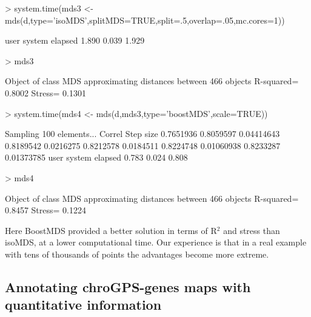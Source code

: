 \documentclass[a4paper,12pt,nogin]{article}
\newcommand{\newtext}[1]{{\color{blue} #1}} %
\begin{document}
\footnotesize
\begin{Schunk}
\begin{Sinput}
> system.time(mds3 <- mds(d,type='isoMDS',splitMDS=TRUE,split=.5,overlap=.05,mc.cores=1))
\end{Sinput}
\begin{Soutput}
   user  system elapsed 
  1.890   0.039   1.929 
\end{Soutput}
\begin{Sinput}
> mds3
\end{Sinput}
\begin{Soutput}
Object of class MDS approximating distances between 466 objects 
R-squared= 0.8002 Stress= 0.1301 
\end{Soutput}
\begin{Sinput}
> system.time(mds4 <- mds(d,mds3,type='boostMDS',scale=TRUE))
\end{Sinput}
\begin{Soutput}
Sampling  100 elements...
   Correl   Step size
0.7651936
0.8059597 0.04414643 
0.8189542 0.0216275 
0.8212578 0.0184511 
0.8224748 0.01060938 
0.8233287 0.01373785 
   user  system elapsed 
  0.783   0.024   0.808 
\end{Soutput}
\begin{Sinput}
> mds4
\end{Sinput}
\begin{Soutput}
Object of class MDS approximating distances between 466 objects 
R-squared= 0.8457 Stress= 0.1224 
\end{Soutput}
\end{Schunk}
\normalsize

\newtext{
Here BoostMDS provided a better solution in terms of R$^2$ and stress than isoMDS, at a lower computational time.
Our experience is that in a real example with tens of thousands of points
the advantages become more extreme.
}

\subsection{Annotating chroGPS-genes maps with quantitative
  information}
\label{sec:xpr}
 
\end{document}
